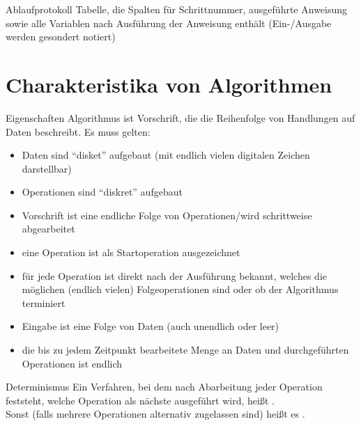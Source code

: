 \begin{Def}{Ablaufprotokoll}
    Tabelle, die Spalten für Schrittnummer, ausgeführte Anweisung sowie
    alle Variablen nach Ausführung der Anweisung enthält (Ein-/Ausgabe werden
    gesondert notiert)
\end{Def}

\section{%
    Charakteristika von Algorithmen%
}

\begin{Def}{Eigenschaften}
    Algorithmus ist Vorschrift, die die Reihenfolge von Handlungen auf Daten
    beschreibt. Es muss gelten:
    \begin{itemize}
        \item Daten sind "`disket"' aufgebaut (mit endlich vielen
        digitalen Zeichen darstellbar)

        \item Operationen sind "`diskret"' aufgebaut

        \item Vorschrift ist eine endliche Folge von Operationen/wird
        schrittweise abgearbeitet

        \item eine Operation ist als Startoperation ausgezeichnet

        \item für jede Operation ist direkt nach der Ausführung bekannt,
        welches die möglichen (endlich vielen) Folgeoperationen sind oder ob
        der Algorithmus terminiert

        \item Eingabe ist eine Folge von Daten (auch unendlich oder leer)

        \item die bis zu jedem Zeitpunkt bearbeitete Menge an Daten
        und durchgeführten Operationen ist endlich
    \end{itemize}
\end{Def}

\begin{Def}{Determinismus}
    Ein Verfahren, bei dem nach Abarbeitung jeder Operation feststeht, welche
    Operation als nächste ausgeführt wird, heißt . \\
    Sonst (falls mehrere Operationen alternativ zugelassen sind) heißt es
    .
\end{Def}

